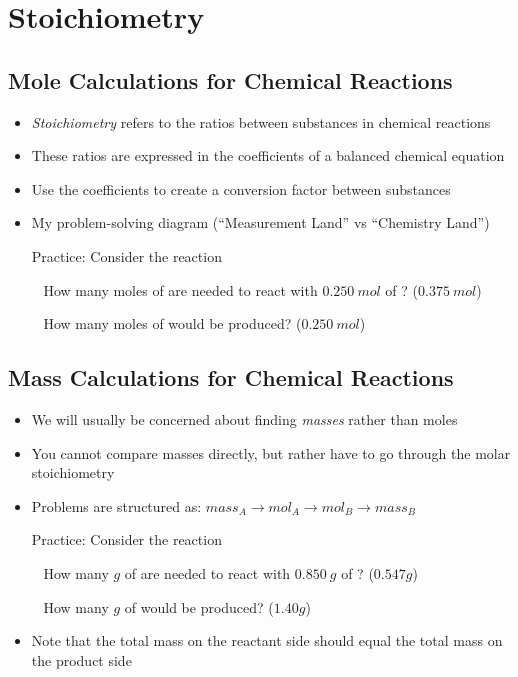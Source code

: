 \documentclass[12pt, openany, letterpaper]{memoir}
\begin{document}
\chapter{Stoichiometry}
\section{Mole Calculations for Chemical Reactions}
\begin{itemize}
	\item \emph{Stoichiometry} refers to the ratios between substances in chemical reactions
	\item These ratios are expressed in the coefficients of a balanced chemical equation
	\item Use the coefficients to create a conversion factor between substances
	\item My problem-solving diagram (``Measurement Land'' vs ``Chemistry Land'')

	      Practice: Consider the reaction 

	      ~\hphantom{Practice:} How many moles of  are needed to react with $0.250~mol$ of ? \hspace{1em} ($0.375~mol$)

	      ~\hphantom{Practice:} How many moles of  would be produced? \hspace{1em} ($0.250~mol$)
\end{itemize}
\section{Mass Calculations for Chemical Reactions}
\begin{itemize}
	\item We will usually be concerned about finding \emph{masses} rather than moles
	\item You cannot compare masses directly, but rather have to go through the molar stoichiometry
	\item Problems are structured as: $mass_A\rightarrow mol_A\rightarrow mol_B\rightarrow mass_B$

	      Practice: Consider the reaction 

	      ~\hphantom{Practice:} How many $g$ of  are needed to react with $0.850~g$ of ? \hspace{1em} ($0.547g$)

	      ~\hphantom{Practice:} How many $g$ of  would be produced? \hspace{1em} ($1.40g$)

	\item Note that the total mass on the reactant side should equal the total mass on the product side
\end{itemize}
\end{document}
